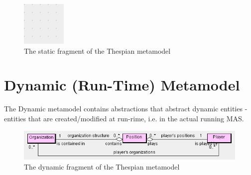 \begin{figure}[ht]
	\centering
	\includegraphics[width=\textwidth]{images/thespian-static-metamodel.png}
	\caption{The static fragment of the Thespian metamodel}
	\label{figure:thespian-static-metamodel}
\end{figure}

\section{Dynamic (Run-Time) Metamodel}

The Dynamic metamodel contains abstractions that abstract dynamic entities - entities that are created/modified at run-rime, i.e. in the actual running MAS.

\begin{figure}[ht]
	\centering
	\includegraphics[width=\textwidth]{images/thespian-dynamic-metamodel.png}
	\caption{The dynamic fragment of the Thespian metamodel}
	\label{figure:thespian-dynamic-metamodel}
\end{figure}

